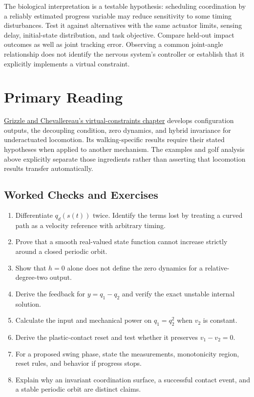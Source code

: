 \documentclass[12pt, openany]{book}
\theoremstyle{plain}
\begin{document}
The biological interpretation is a testable hypothesis: scheduling coordination by a reliably estimated progress variable may reduce sensitivity to some timing disturbances. Test it against alternatives with the same actuator limits, sensing delay, initial-state distribution, and task objective. Compare held-out impact outcomes as well as joint tracking error. Observing a common joint-angle relationship does not identify the nervous system's controller or establish that it explicitly implements a virtual constraint.

\section{Primary Reading}

\href{https://grizzle.robotics.umich.edu/files/HZD_HandbookApril2015.pdf}{Grizzle and Chevallereau's virtual-constraints chapter} develops configuration outputs, the decoupling condition, zero dynamics, and hybrid invariance for underactuated locomotion. Its walking-specific results require their stated hypotheses when applied to another mechanism. The examples and golf analysis above explicitly separate those ingredients rather than asserting that locomotion results transfer automatically.

\begin{samepage}
\section{Worked Checks and Exercises}

\begin{enumerate}[itemsep=0.25em,parsep=0pt]
\item Differentiate $q_d(s(t))$ twice. Identify the terms lost by treating a curved path as a velocity reference with arbitrary timing.
\item Prove that a smooth real-valued state function cannot increase strictly around a closed periodic orbit.
\item Show that $h=0$ alone does not define the zero dynamics for a relative-degree-two output.
\item Derive the feedback for $y=q_1-q_2$ and verify the exact unstable internal solution.
\item Calculate the input and mechanical power on $q_1=q_2^2$ when $v_2$ is constant.
\item Derive the plastic-contact reset and test whether it preserves $v_1-v_2=0$.
\item For a proposed swing phase, state the measurements, monotonicity region, reset rules, and behavior if progress stops.
\item Explain why an invariant coordination surface, a successful contact event, and a stable periodic orbit are distinct claims.
\end{enumerate}
\end{samepage}
\end{document}
